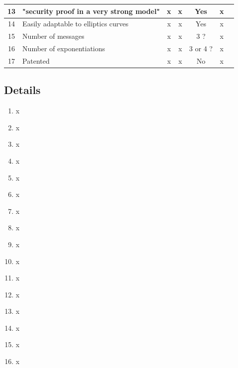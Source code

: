 \documentclass[../report.tex]{subfiles}
\begin{document}
\begin{center}
\begin{tabular}{ | c | p{8cm} || c | c | c | c | c | }
     13 & "security proof in a very strong model" & x & x & Yes & x \\ \hline
     
     
     14 & Easily adaptable to elliptics curves & x & x & Yes & x \\ \hline
     15 & Number of messages & x & x & 3 ? & x \\ \hline
     16 & Number of exponentiations & x & x & 3 or 4 ? & x \\ \hline
     17 & Patented & x & x & No & x \\ \hline

     \end{tabular}
 \end{center}
 
\subsection{Details} \label{sec:comparison_details}

\begin{enumerate}
 \item x
 \item x
 \item x
 \item x
 \item x
 \item x
 \item x
 \item x
 \item x
 \item x
 \item x
 \item x
 \item x
 \item x
 \item x
 \item x
\end{enumerate}
\end{document}

